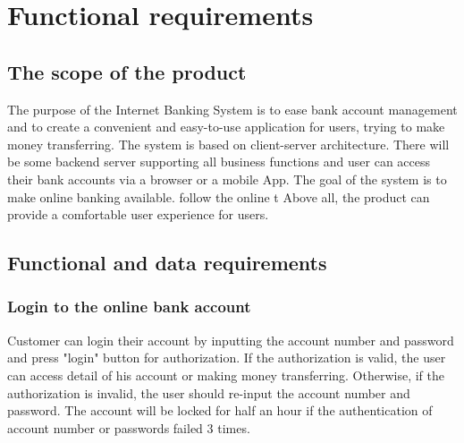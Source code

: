 \documentclass{scrreprt}
\begin{document}


\chapter{Functional requirements}

\section{The scope of the product}
The purpose of the Internet Banking System is to ease bank account management and to create a convenient and easy-to-use application for users, trying to make money transferring. The system is based on client-server architecture. There will be some backend server supporting all business functions and user can access their bank accounts via a browser or a mobile App. The goal of the system is to make online banking available. follow the online t Above all, the product can provide a comfortable user experience for users.

\section{Functional and data requirements}
\subsection{Login to the online bank account}
Customer can login their account by inputting the account number and password and press "login" button for authorization. If the authorization is valid, the user can access detail of his account or making money transferring. Otherwise, if the authorization is invalid, the user should re-input the account number and password. The account will be locked for half an hour if the authentication of account number or passwords failed 3 times. 
\end{document}
